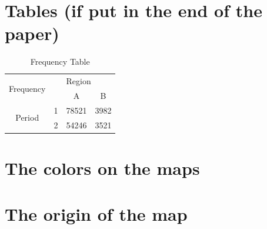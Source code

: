 \pagebreak






\pagebreak
\section*{Tables (if put in the end of the paper)}

\begin{table}[h!]
    \centering
    \begin{tabular}{cccc}
\hline \hline
\multirow{2}{*}{Frequency} &   & \multicolumn{2}{l}{Region}       \\
                           &   & A           & B                  \\
\hline                           
\multirow{2}{*}{Period}    & 1 & 78521          & 3982            \\
                           & 2 & 54246          & 3521            \\
\hline \hline
    \end{tabular}
    \caption{Frequency Table}
    \label{paper1_table_frequency}
\end{table}  




\pagebreak
\begin{subappendices}

\section{The colors on the maps}
\lipsum[10-10]

\section{{The origin of the map}}
\lipsum[11-11]


\end{subappendices}